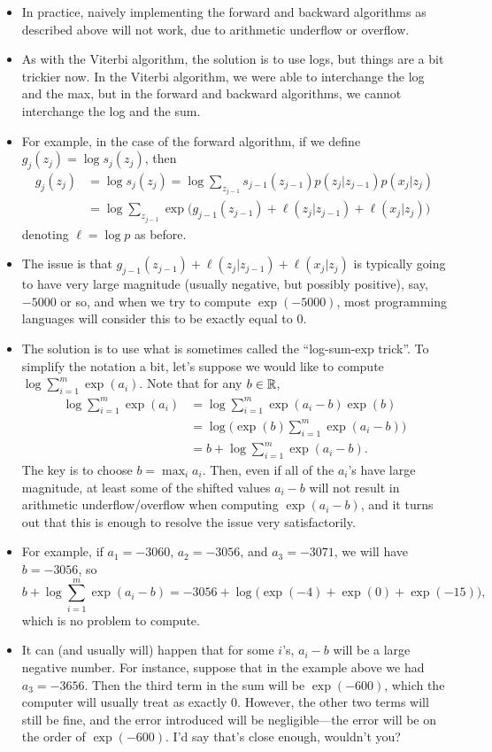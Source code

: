 \documentclass[12pt]{article}
\begin{document}
\begin{itemize}
\item In practice, naively implementing the forward and backward algorithms as described above will not work, due to arithmetic underflow or overflow.
\item As with the Viterbi algorithm, the solution is to use logs, but things are a bit trickier now.  In the Viterbi algorithm, we were able to interchange the log and the max, but in the forward and backward algorithms, we cannot interchange the log and the sum.
\item For example, in the case of the forward algorithm, if we define $g_j(z_j) = \log s_j(z_j)$, then
\begin{align*}
g_j(z_j) & = \log s_j(z_j) = \log \sum_{z_{j -1}} s_{j -1}(z_{j -1}) p(z_j | z_{j -1}) p(x_j | z_j)\\
& = \log \sum_{z_{j -1}} \exp \big(g_{j -1}(z_{j -1}) + \ell(z_j | z_{j -1}) + \ell(x_j | z_j) \big)
\end{align*}
denoting $\ell = \log p$ as before.
\item The issue is that $g_{j -1}(z_{j -1}) + \ell(z_j | z_{j -1}) + \ell(x_j | z_j)$ is typically going to have very large magnitude (usually negative, but possibly positive), say, $-5000$ or so, and when we try to compute $\exp(-5000)$, most programming languages will consider this to be exactly equal to $0$. 
\item The solution is to use what is sometimes called the ``log-sum-exp trick''.  To simplify the notation a bit, let's suppose we would like to compute $\log \sum_{i = 1}^m \exp(a_i)$.  Note that for any $b \in \mathbb{R}$,
\begin{align*}
\log \sum_{i = 1}^m \exp(a_i) 
&= \log \sum_{i = 1}^m \exp(a_i-b)\exp(b)\\
&= \log \Big(\exp(b)\sum_{i = 1}^m \exp(a_i-b)\Big)\\
&= b + \log \sum_{i = 1}^m \exp(a_i-b).
\end{align*}
The key is to choose $b = \max_i a_i$.  Then, even if all of the $a_i$'s have large magnitude, at least some of the shifted values $a_i - b$ will not result in arithmetic underflow/overflow when computing $\exp(a_i - b)$, and it turns out that this is enough to resolve the issue very satisfactorily.
\item For example, if $a_1 = -3060$, $a_2 = -3056$, and $a_3 = -3071$, we will have $b = -3056$, so 
$$ b + \log \sum_{i = 1}^m \exp(a_i-b) = -3056 + \log \big(\exp(-4) + \exp(0) + \exp(-15)),$$
which is no problem to compute.
\item It can (and usually will) happen that for some $i$'s, $a_i-b$ will be a large negative number.  For instance, suppose that in the example above we had $a_3 = -3656$. Then the third term in the sum will be $\exp(-600)$, which the computer will usually treat as exactly $0$. However, the other two terms will still be fine, and the error introduced will be negligible---the error will be on the order of $\exp(-600)$.  I'd say that's close enough, wouldn't you?
\end{itemize}
\end{document}
